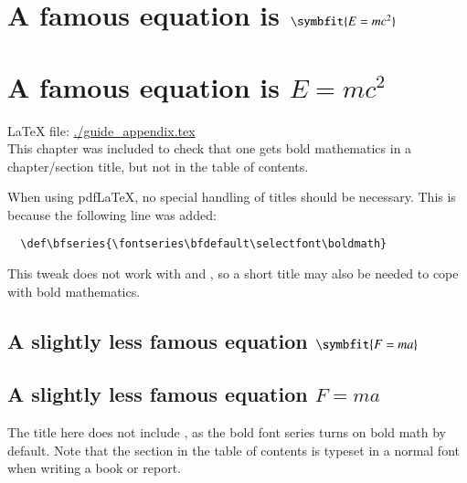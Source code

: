 \ifXeTeX
\chapter{A famous equation is $\symbfit{E = mc^{2}}$}%
\label{sec:emc2}
\else
\chapter{A famous equation is $E = mc^{2}$}%
\label{sec:emc2}
\fi

\LaTeX{} file: \url{./guide_appendix.tex}\\[1ex]
\noindent
This chapter was included to check that one gets bold mathematics in
a chapter/section title, but not in the table of contents.

When using pdf\LaTeX, no special handling of titles should be necessary.
This is because the following line was added:
\begin{verbatim}
  \def\bfseries{\fontseries\bfdefault\selectfont\boldmath}
\end{verbatim}

This tweak does not work with \XeLaTeX{} and \LuaLaTeX,
so a short title may also be needed to cope with bold mathematics.

\ifXeTeX
\section{A slightly less famous equation $\symbfit{F = m a}$}%
\label{sec:fma}
\else
\section{A slightly less famous equation $F = m a$}%
\label{sec:fma}
\fi

The title here does not include , as the bold font series turns on bold math by default.
Note that the
section in the table of contents is typeset in a normal font when
writing a book or report.


